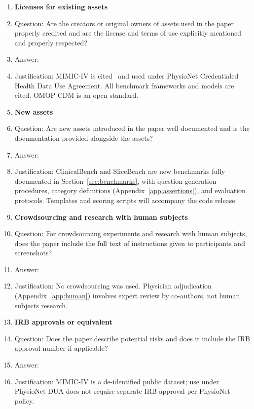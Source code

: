 \begin{enumerate}
\item {\bf Licenses for existing assets}
    \item[] Question: Are the creators or original owners of assets used in the paper properly credited and are the license and terms of use explicitly mentioned and properly respected?
    \item[] Answer: \answerYes{}
    \item[] Justification: MIMIC-IV is cited~\cite{johnson2023mimiciv} and used under PhysioNet Credentialed Health Data Use Agreement. All benchmark frameworks and models are cited. OMOP CDM is an open standard.

\item {\bf New assets}
    \item[] Question: Are new assets introduced in the paper well documented and is the documentation provided alongside the assets?
    \item[] Answer: \answerYes{}
    \item[] Justification: ClinicalBench and SliceBench are new benchmarks fully documented in Section~\ref{sec:benchmarks}, with question generation procedures, category definitions (Appendix~\ref{app:assertions}), and evaluation protocols. Templates and scoring scripts will accompany the code release.

\item {\bf Crowdsourcing and research with human subjects}
    \item[] Question: For crowdsourcing experiments and research with human subjects, does the paper include the full text of instructions given to participants and screenshots?
    \item[] Answer: \answerNA{}
    \item[] Justification: No crowdsourcing was used. Physician adjudication (Appendix~\ref{app:human}) involves expert review by co-authors, not human subjects research.

\item {\bf IRB approvals or equivalent}
    \item[] Question: Does the paper describe potential risks and does it include the IRB approval number if applicable?
    \item[] Answer: \answerNA{}
    \item[] Justification: MIMIC-IV is a de-identified public dataset; use under PhysioNet DUA does not require separate IRB approval per PhysioNet policy.


\end{enumerate}

